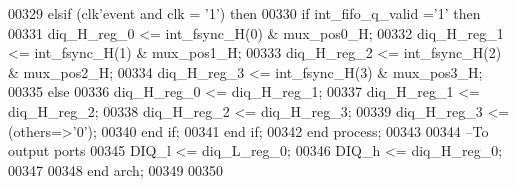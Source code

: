 \begin{DoxyCode}
00329       \textcolor{keywordflow}{elsif} \textcolor{vhdlchar}{(}\textcolor{vhdlchar}{clk}\textcolor{vhdlchar}{'}\textcolor{vhdlkeyword}{event} \textcolor{keywordflow}{and} \textcolor{vhdlchar}{clk} \textcolor{vhdlchar}{=} \textcolor{vhdlchar}{'}\textcolor{vhdllogic}{}\textcolor{vhdllogic}{1}\textcolor{vhdlchar}{'}\textcolor{vhdlchar}{)} \textcolor{keywordflow}{then}
00330          \textcolor{keywordflow}{if} \textcolor{vhdlchar}{int_fifo_q_valid} \textcolor{vhdlchar}{=}\textcolor{vhdlchar}{'}\textcolor{vhdllogic}{}\textcolor{vhdllogic}{1}\textcolor{vhdlchar}{'} \textcolor{keywordflow}{then} 
00331             \textcolor{vhdlchar}{diq_H_reg_0} \textcolor{vhdlchar}{<=} \textcolor{vhdlchar}{int_fsync_H}\textcolor{vhdlchar}{(}\textcolor{vhdllogic}{}\textcolor{vhdllogic}{0}\textcolor{vhdlchar}{)} \textcolor{vhdlchar}{&} \textcolor{vhdlchar}{mux_pos0_H};
00332             \textcolor{vhdlchar}{diq_H_reg_1} \textcolor{vhdlchar}{<=} \textcolor{vhdlchar}{int_fsync_H}\textcolor{vhdlchar}{(}\textcolor{vhdllogic}{}\textcolor{vhdllogic}{1}\textcolor{vhdlchar}{)} \textcolor{vhdlchar}{&} \textcolor{vhdlchar}{mux_pos1_H};
00333             \textcolor{vhdlchar}{diq_H_reg_2} \textcolor{vhdlchar}{<=} \textcolor{vhdlchar}{int_fsync_H}\textcolor{vhdlchar}{(}\textcolor{vhdllogic}{}\textcolor{vhdllogic}{2}\textcolor{vhdlchar}{)} \textcolor{vhdlchar}{&} \textcolor{vhdlchar}{mux_pos2_H};
00334             \textcolor{vhdlchar}{diq_H_reg_3} \textcolor{vhdlchar}{<=} \textcolor{vhdlchar}{int_fsync_H}\textcolor{vhdlchar}{(}\textcolor{vhdllogic}{}\textcolor{vhdllogic}{3}\textcolor{vhdlchar}{)} \textcolor{vhdlchar}{&} \textcolor{vhdlchar}{mux_pos3_H};
00335          \textcolor{keywordflow}{else} 
00336             \textcolor{vhdlchar}{diq_H_reg_0} \textcolor{vhdlchar}{<=} \textcolor{vhdlchar}{diq_H_reg_1};
00337             \textcolor{vhdlchar}{diq_H_reg_1} \textcolor{vhdlchar}{<=} \textcolor{vhdlchar}{diq_H_reg_2};
00338             \textcolor{vhdlchar}{diq_H_reg_2} \textcolor{vhdlchar}{<=} \textcolor{vhdlchar}{diq_H_reg_3};
00339             \textcolor{vhdlchar}{diq_H_reg_3} \textcolor{vhdlchar}{<=} \textcolor{vhdlchar}{(}\textcolor{keywordflow}{others}\textcolor{vhdlchar}{=}\textcolor{vhdlchar}{>}\textcolor{vhdlchar}{'}\textcolor{vhdllogic}{}\textcolor{vhdllogic}{0}\textcolor{vhdlchar}{'}\textcolor{vhdlchar}{)};
00340          \textcolor{keywordflow}{end} \textcolor{keywordflow}{if}; 
00341       \textcolor{keywordflow}{end} \textcolor{keywordflow}{if};
00342 \textcolor{keywordflow}{end} \textcolor{keywordflow}{process};
00343     
00344 \textcolor{keyword}{--To output ports   }
00345 \textcolor{vhdlchar}{DIQ_l} \textcolor{vhdlchar}{<=} \textcolor{vhdlchar}{diq_L_reg_0};
00346 \textcolor{vhdlchar}{DIQ_h} \textcolor{vhdlchar}{<=} \textcolor{vhdlchar}{diq_H_reg_0}; 
00347  
00348 \textcolor{keywordflow}{end} \textcolor{vhdlchar}{arch};   
00349 
00350 
\end{DoxyCode}
